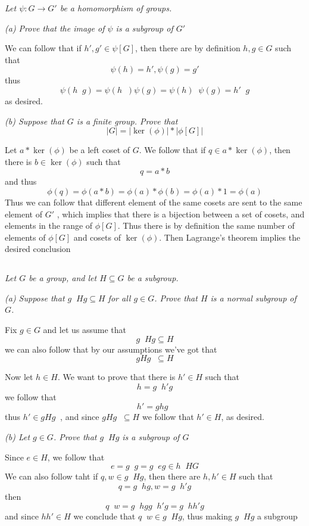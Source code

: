 \documentclass[11pt,oneside,titlepage]{book}
\DeclareMathOperator \inv {^{-1}}
\begin{document}
\textit{Let $\psi: G \to G'$ be a homomorphism of groups.}

\textit{(a) Prove that the image of $\psi$ is a subgroup of $G'$}

We can follow that if $h', g' \in \psi[G]$, then there are by
definition $h, g \in G$ such that
$$\psi(h) = h', \psi(g) = g'$$
thus
$$\psi(h\inv g) = \psi(h\inv) \psi(g) = \psi(h)\inv \psi(g) = h'\inv g$$
as desired.

\textit{(b) Suppose that $G$ is a finite group. Prove that
  $$|G| = |\ker(\phi)| * |\phi[G]|$$}

Let $a * \ker(\phi)$ be a left coset of $G$. We follow that if $q \in
a * \ker(\phi)$, then there is $b \in \ker(\phi)$ such that
$$q = a * b$$
and thus
$$\phi(q) = \phi(a * b) = \phi(a) * \phi(b) = \phi(a) * 1 = \phi(a)$$
Thus we can follow that different element of the same cosets are sent
to the same element of $G'$ , which implies that there is a bijection
between a set of cosets, and elements in the range of $\phi[G]$.  Thus
there is by definition the same number of elements of $\phi[G]$ and
cosets of $\ker(\phi)$. Then Lagrange's theorem implies the desired
conclusion

\subsection{}

\textit{Let $G$ be a group, and let $H \subseteq G$ be a subgroup.}

\textit{(a) Suppose that $g\inv H g \subseteq H$ for all $g \in G$.
Prove that $H$ is a normal subgroup of $G$.}

Fix $g \in G$ and let us assume that
$$g\inv H g \subseteq H$$
we can also follow that by our assumptions we've got that
$$g H g\inv \subseteq H$$

Now let $h \in H$. We want to prove that there is $h' \in H$ such that
$$h = g\inv h' g$$
we follow that
$$h' = g h g\inv$$
thus $h' \in g H g\inv$, and since $g H g\inv \subseteq H$ we follow
that $h' \in H$, as desired.

\textit{(b) Let $g \in G$. Prove that $g\inv H g$ is a subgroup of
$G$}

Since $e \in H$, we follow that
$$e = g\inv g = g\inv e g \in h\inv H G$$
We can also follow taht if $q, w \in g\inv H g$, then there are $h, h'
\in H$ such that
$$q = g\inv h g, w = g\inv h' g$$
then
$$q\inv w = g\inv h g g\inv h' g = g\inv h h' g$$
and since $h h' \in H$ we conclude that $q\inv w \in g\inv H g$, thus
making $g\inv H g$ a subgroup
\end{document}
